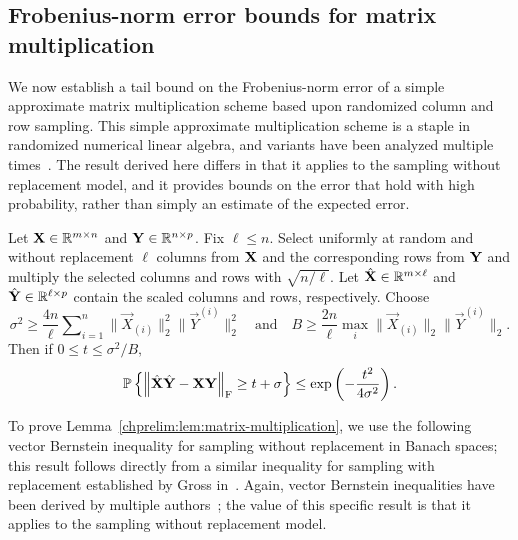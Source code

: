 \subsection{Frobenius-norm error bounds for matrix multiplication}

We now establish a tail bound on the Frobenius-norm error of a simple approximate 
matrix multiplication scheme based upon randomized column and row sampling. 
This simple approximate multiplication scheme is a staple in
randomized numerical linear algebra, and variants have been analyzed multiple 
times~\cite{DK01,DKM06a,Sar06}. The result derived here differs in that it applies to the 
sampling without replacement model, and it provides bounds on the error that hold 
with high probability, rather than simply an estimate of the expected error.


\begin{lemma}
\label{chprelim:lem:matrix-multiplication}
Let $\mathbf{X} \in \mathbb{R}^{m \times n}$ and $\mathbf{Y} \in \mathbb{R}^{n \times p}$. 
Fix $\ell \leq n$. Select uniformly at random and without replacement $\ell$ columns 
from $\mathbf{X}$ and the corresponding rows from $\mathbf{Y}$ and multiply the selected
columns and rows with $\sqrt{n/\ell}$. Let $\hat{\mathbf{X}} \in \mathbb{R}^{m \times \ell}$ and
$\hat{\mathbf{Y}} \in \mathbb{R}^{\ell \times p}$ contain the scaled columns and rows, 
respectively.
Choose
\[
\sigma^2 \geq \frac{4 n}{\ell} \sum\nolimits_{i=1}^n \|\vec{X}_{(i)}\|_2^2
\|\vec{Y}^{(i)}\|_2^2 \quad \text{and} 
\quad B \geq \frac{2 n}{\ell} \max_i \|\vec{X}_{(i)}\|_2 \|\vec{Y}^{(i)}\|_2.
\]
Then if $ 0 \leq t \leq \sigma^2/B,$
\[
\mathbb{P}\left\{\left\|\hat{\mathbf{X}} \hat{\mathbf{Y}} - \mathbf{X} \mathbf{Y}\right\|_\mathrm{F} \geq t + \sigma \right\} \leq 
\mathrm{exp}\left( -\frac{t^2}{4\sigma^2}\right).
\]
\end{lemma}

To prove Lemma~\ref{chprelim:lem:matrix-multiplication},
we use the following vector Bernstein inequality for sampling without 
replacement in Banach spaces; this result follows directly from a similar 
inequality for sampling with replacement established by Gross in~\cite{Gross11}.
Again, vector Bernstein inequalities have been derived by multiple authors~\cite{LT91,BLM03,Recht09,T10a,CP11,Gross11};
the value of this specific result is that it applies to the sampling without
replacement model.

